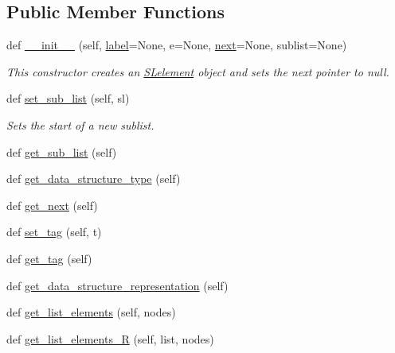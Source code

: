 \subsection*{Public Member Functions}
\begin{DoxyCompactItemize}
\item 
def \mbox{\hyperlink{class_bridges_1_1_m_lelement_1_1_m_lelement_adf7e1429b30cbd38b593e4266e795650}{\+\_\+\+\_\+init\+\_\+\+\_\+}} (self, \mbox{\hyperlink{class_bridges_1_1_element_1_1_element_a301fe5be8cf72b2c62f6a218feeb9166}{label}}=None, e=None, \mbox{\hyperlink{class_bridges_1_1_s_lelement_1_1_s_lelement_a650935f5a68b49de4c222cc4c8b0c778}{next}}=None, sublist=None)
\begin{DoxyCompactList}\small\item\em This constructor creates an \mbox{\hyperlink{namespace_bridges_1_1_s_lelement}{S\+Lelement}} object and sets the next pointer to null. \end{DoxyCompactList}\item 
def \mbox{\hyperlink{class_bridges_1_1_m_lelement_1_1_m_lelement_a621bc963cf3cd0638fe2bc887ad3d1b3}{set\+\_\+sub\+\_\+list}} (self, sl)
\begin{DoxyCompactList}\small\item\em Sets the start of a new sublist. \end{DoxyCompactList}\item 
def \mbox{\hyperlink{class_bridges_1_1_m_lelement_1_1_m_lelement_a6e90fc95e186efee921d6dfe1c4e9e94}{get\+\_\+sub\+\_\+list}} (self)
\item 
def \mbox{\hyperlink{class_bridges_1_1_m_lelement_1_1_m_lelement_a9b7a6ee7ff5c9e7a57aa5e88983c0a8e}{get\+\_\+data\+\_\+structure\+\_\+type}} (self)
\item 
def \mbox{\hyperlink{class_bridges_1_1_m_lelement_1_1_m_lelement_ad1bb911d71086b8b27cd4d76eebcde05}{get\+\_\+next}} (self)
\item 
def \mbox{\hyperlink{class_bridges_1_1_m_lelement_1_1_m_lelement_a25d6a2e4524e4427b9f540fc41d44508}{set\+\_\+tag}} (self, t)
\item 
def \mbox{\hyperlink{class_bridges_1_1_m_lelement_1_1_m_lelement_a20efe494cec340d83415c07b5da8d8dd}{get\+\_\+tag}} (self)
\item 
def \mbox{\hyperlink{class_bridges_1_1_m_lelement_1_1_m_lelement_a8b4e8441ab968b46e487c64424954b7e}{get\+\_\+data\+\_\+structure\+\_\+representation}} (self)
\item 
def \mbox{\hyperlink{class_bridges_1_1_m_lelement_1_1_m_lelement_adcb6bb39c380a6a8b2c8b5438dfdd738}{get\+\_\+list\+\_\+elements}} (self, nodes)
\item 
def \mbox{\hyperlink{class_bridges_1_1_m_lelement_1_1_m_lelement_acee0cb1ef6a83ad38aa41b5be4aa2b1b}{get\+\_\+list\+\_\+elements\+\_\+R}} (self, list, nodes)
\end{DoxyCompactItemize}
